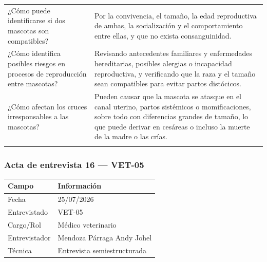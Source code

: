 \documentclass[journal,onecolumn]{IEEEtran}
\begin{document}
{\begin{longtable}{@{}p{5.6cm} p{9.4cm}@{}}
			¿Cómo puede identificarse si dos mascotas son compatibles? & Por la convivencia, el tamaño, la edad reproductiva de ambas, la socialización y el comportamiento entre ellas, y que no exista consanguinidad. \\ \addlinespace
			
			¿Cómo identifica posibles riesgos en procesos de reproducción entre mascotas? & Revisando antecedentes familiares y enfermedades hereditarias, posibles alergias o incapacidad reproductiva, y verificando que la raza y el tamaño sean compatibles para evitar partos distócicos. \\ \addlinespace
			
			¿Cómo afectan los cruces irresponsables a las mascotas? & Pueden causar que la mascota se atasque en el canal uterino, partos sistémicos o momificaciones, sobre todo con diferencias grandes de tamaño, lo que puede derivar en cesáreas o incluso la muerte de la madre o las crías. \\ \addlinespace
			
		\end{longtable}
	}
	
	
	\subsubsection*{Acta de entrevista 16 --- VET-05}
	
	\begin{table}[H]
		\centering\small
		\begin{tabularx}{\textwidth}{@{}l X@{}}
			\toprule
			\textbf{Campo} & \textbf{Información} \\
			\midrule
			
			Fecha & 25/07/2026 \\
			
			Entrevistado & VET-05 \\
			
			Cargo/Rol & Médico veterinario \\
			
			Entrevistador & Mendoza Párraga Andy Johel \\
			
			Técnica & Entrevista semiestructurada \\
			
			\bottomrule
		\end{tabularx}
	\end{table}
	
\end{document}
